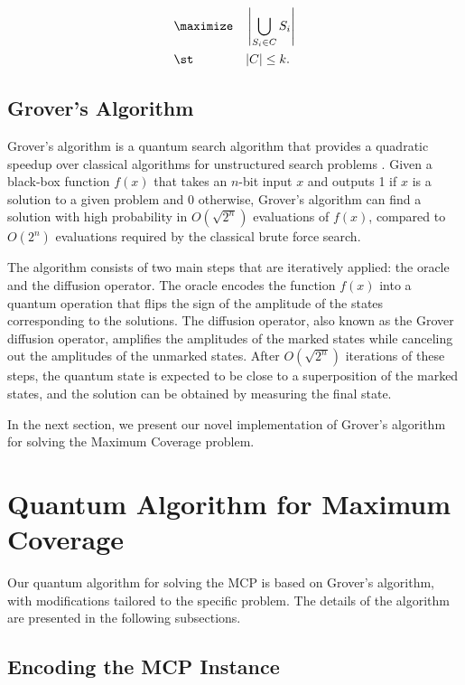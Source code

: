 \begin{equation}
\begin{aligned}
& \maximize && \left| \bigcup_{S_i \in C} S_i \right| \\
& \st && |C| \leq k.
\end{aligned}
\end{equation}

\subsection{Grover's Algorithm}

Grover's algorithm is a quantum search algorithm that provides a quadratic speedup over classical algorithms for unstructured search problems \cite{grover1996}. Given a black-box function $f(x)$ that takes an $n$-bit input $x$ and outputs 1 if $x$ is a solution to a given problem and 0 otherwise, Grover's algorithm can find a solution with high probability in $O(\sqrt{2^n})$ evaluations of $f(x)$, compared to $O(2^n)$ evaluations required by the classical brute force search.

The algorithm consists of two main steps that are iteratively applied: the oracle and the diffusion operator. The oracle encodes the function $f(x)$ into a quantum operation that flips the sign of the amplitude of the states corresponding to the solutions. The diffusion operator, also known as the Grover diffusion operator, amplifies the amplitudes of the marked states while canceling out the amplitudes of the unmarked states. After $O(\sqrt{2^n})$ iterations of these steps, the quantum state is expected to be close to a superposition of the marked states, and the solution can be obtained by measuring the final state.

In the next section, we present our novel implementation of Grover's algorithm for solving the Maximum Coverage problem.

\section{Quantum Algorithm for Maximum Coverage}\label{sec:quantum_algorithm}

Our quantum algorithm for solving the MCP is based on Grover's algorithm, with modifications tailored to the specific problem. The details of the algorithm are presented in the following subsections.

\subsection{Encoding the MCP Instance}

